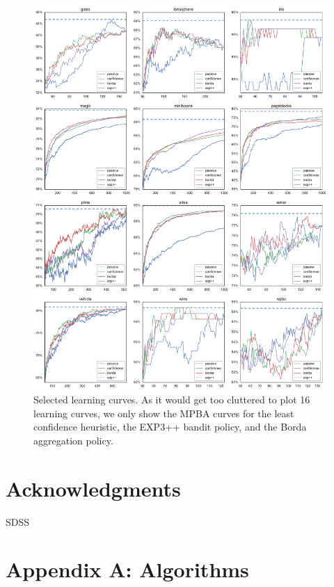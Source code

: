 \documentclass[fleqn,10pt,lineno]{wlpeerj} %
\begin{document}
\begin{figure}[tbp]
	\centering
	\includegraphics[width=\textwidth]{figures/learning_curves}
	\caption[Selected learning curves]{Selected learning curves. As it would
	get too cluttered to plot 16 learning curves, we only show the MPBA curves
	for the least confidence heuristic, the EXP3++ bandit policy, and the Borda
	aggregation policy.}
	\label{fig:learning_curves}
\end{figure}


\section*{Acknowledgments}

SDSS



\pagebreak

\section*{Appendix A: Algorithms}
\end{document}
